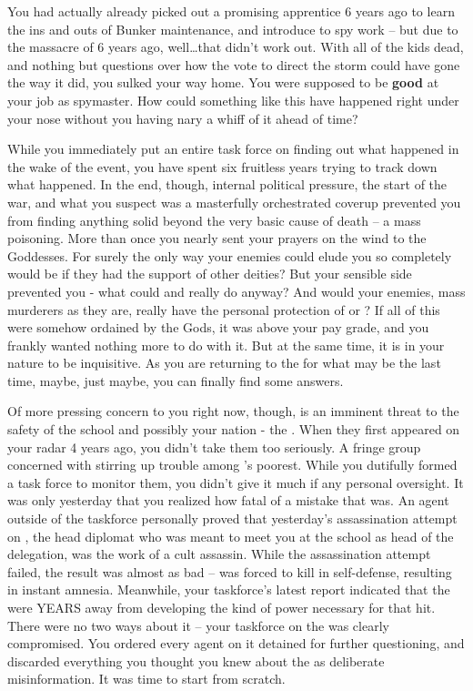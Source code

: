 \documentclass[char]{GL2020}
\begin{document}
You had actually already picked out a promising apprentice 6 years ago to learn the ins and outs of Bunker maintenance, and introduce to spy work -- but due to the massacre of 6 years ago, well\ldots that didn’t work out. With all of the kids dead, and nothing but questions over how the vote to direct the storm could have gone the way it did, you sulked your way home. You were supposed to be \textbf{good} at your job as spymaster. How could something like this have happened right under your nose without you having nary a whiff of it ahead of time? 

While you immediately put an entire task force on finding out what happened in the wake of the event, you have spent six fruitless years trying to track down what happened. In the end, though, internal political pressure, the start of the war, and what you suspect was a masterfully orchestrated coverup prevented you from finding anything solid beyond the very basic cause of death -- a mass poisoning. More than once you nearly sent your prayers on the wind to the Goddesses. For surely the only way your enemies could elude you so completely would be if they had the support of other deities? But your sensible side prevented you - what could \cEbb{} and \cFlow{} really do anyway? And would your enemies, mass murderers as they are, really have the personal protection of \cTechGod{} or \cFarmGod{}? If all of this were somehow ordained by the Gods, it was above your pay grade, and you frankly wanted nothing more to do with it. But at the same time, it is in your nature to be inquisitive. As you are returning to the \pSchool{} for what may be the last time, maybe, just maybe, you can finally find some answers.

Of more pressing concern to you right now, though, is an imminent threat to the safety of the school and possibly your nation - the \pGoaties{}. When they first appeared on your radar 4 years ago, you didn’t take them too seriously. A fringe group concerned with stirring up trouble among \pEarth{}’s poorest. While you dutifully formed a task force to monitor them, you didn’t give it much if any personal oversight. It was only yesterday that you realized how fatal of a mistake that was. An agent outside of the taskforce personally proved that yesterday’s assassination attempt on \cHeadDiplomat{}, the head diplomat who was meant to meet you at the school as head of the \pShip{} delegation, was the work of a cult assassin. While the assassination attempt failed, the result was almost as bad -- \cHeadDiplomat{} was forced to kill in self-defense, resulting in instant amnesia. Meanwhile, your taskforce’s latest report indicated that the \pGoaties{} were YEARS away from developing the kind of power necessary for that hit. There were no two ways about it -- your taskforce on the \pGoaties{} was clearly compromised. You ordered every agent on it detained for further questioning, and discarded everything you thought you knew about the \pGoaties{} as deliberate misinformation. It was time to start from scratch.
\end{document}
